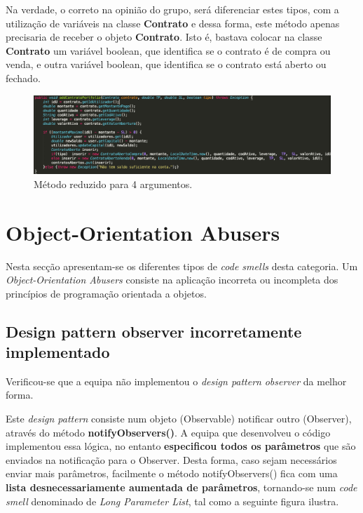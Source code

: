 \hspace{5mm} Na verdade, o correto na opinião do grupo, será diferenciar estes tipos, com a utilização de variáveis na classe \textbf{Contrato} e dessa forma, este método apenas precisaria de receber o objeto \textbf{Contrato}. Isto é, bastava colocar na classe \textbf{Contrato} um variável boolean, que identifica se o contrato é de compra ou venda, e outra variável boolean, que identifica se o contrato está aberto ou fechado.

\begin{figure}[H]
	\centering
	\includegraphics[scale=0.45]{images/bloaters/long-parameters/long-parameters-2.png}
	\caption{Método reduzido para 4 argumentos.}
	\label{img:long-parameter-2}
\end{figure}

\newpage
\section{Object-Orientation Abusers}
Nesta secção apresentam-se os diferentes tipos de \emph{code smells} desta categoria. Um \emph{Object-Orientation Abusers} consiste na aplicação incorreta ou incompleta dos princípios de programação orientada a objetos.

\subsection{Design pattern observer incorretamente implementado}

\hspace{5mm} Verificou-se que a equipa não implementou o \emph{design pattern} \emph{observer} da melhor forma.

\hspace{5mm} Este \emph{design pattern} consiste num objeto (Observable) notificar outro (Observer), através do método \textbf{notifyObservers()}. A equipa que desenvolveu o código implementou essa lógica, no entanto \textbf{especificou todos os parâmetros} que são enviados na notificação para o Observer. Desta forma, caso sejam necessários enviar mais parâmetros, facilmente o método notifyObservers() fica com uma \textbf{lista desnecessariamente aumentada de parâmetros}, tornando-se num \emph{code smell} denominado de \emph{Long Parameter List}, tal como a seguinte figura ilustra.

